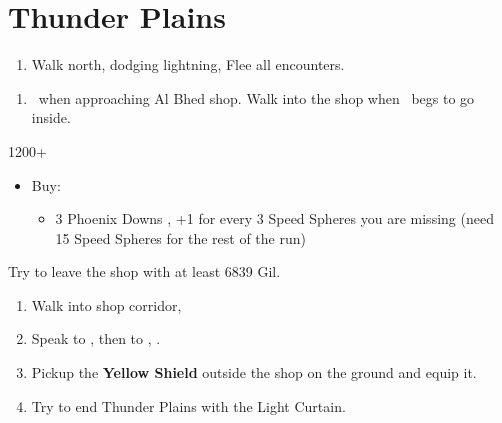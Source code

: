 \chapter{Thunder Plains}

\begin{enumerate}
    \item Walk north, dodging lightning, Flee all encounters.
\end{enumerate}
\begin{enumerate}[resume]
    \item \sd\ when approaching Al Bhed shop. Walk into the shop when \rikku\ begs to go inside.
\end{enumerate}
\begin{shop}{1200+}
    \begin{itemize}
        \item Buy:
        \begin{itemize}
            \item 3 Phoenix Downs
            , +1 for every 3 Speed Spheres you are missing (need 15 Speed Spheres for the rest of the run)
        \end{itemize}
    \end{itemize}
    Try to leave the shop with at least 6839 Gil.
\end{shop}
\begin{enumerate}[resume]
    \item Walk into shop corridor, \cs[2:00]
    \item Speak to \auron, then to \rikku, \sd.
    \item Pickup the \textbf{Yellow Shield} outside the shop on the ground and equip it.
    \item Try to end Thunder Plains with the Light Curtain.
\end{enumerate}
